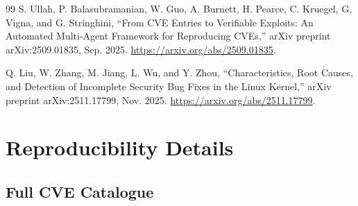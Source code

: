 \documentclass[12pt,a4paper]{report}
\begin{document}
\begin{thebibliography}{99}
 S. Ullah, P. Balasubramanian, W. Guo, A. Burnett, H. Pearce, C. Kruegel, G. Vigna, and G. Stringhini, ``From CVE Entries to Verifiable Exploits: An Automated Multi-Agent Framework for Reproducing CVEs,'' arXiv preprint arXiv:2509.01835, Sep. 2025. \url{https://arxiv.org/abs/2509.01835}.

 Q. Liu, W. Zhang, M. Jiang, L. Wu, and Y. Zhou, ``Characteristics, Root Causes, and Detection of Incomplete Security Bug Fixes in the Linux Kernel,'' arXiv preprint arXiv:2511.17799, Nov. 2025. \url{https://arxiv.org/abs/2511.17799}.

\end{thebibliography}

\appendix


\chapter{Reproducibility Details}
\label{app:reproducibility}

\section{Full CVE Catalogue}
\end{document}
